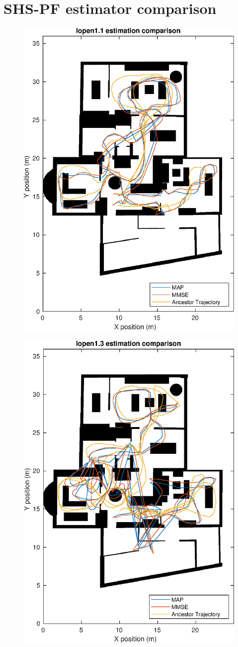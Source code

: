 \section{SHS-PF estimator comparison}
\begin{figure}[H]
	\centering
	\includegraphics[width=0.5\linewidth]{images/20201108_1559_lopen1_1_estimation_comparison}
	\caption{}
	\label{fig:202011081559lopen11estimationcomparison}
\end{figure}
\begin{figure}[H]
	\centering
	\includegraphics[width=0.5\linewidth]{images/20201108_1601_lopen1_3_estimation_comparison}
	\caption{}
	\label{fig:202011081601lopen13estimationcomparison}
\end{figure}
